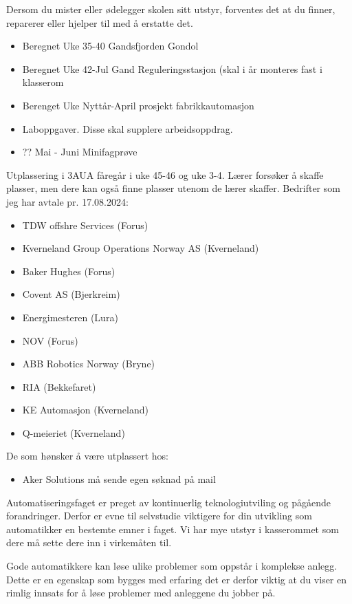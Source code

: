 \noindent
{} Dersom du mister eller ødelegger skolen sitt utstyr, forventes det at du finner, reparerer eller hjelper til med å erstatte det. 
\vskip 10pt
\vfil
\noindent
{} 
\begin{itemize}
	\item Beregnet Uke 35-40 Gandsfjorden Gondol
	\item Beregnet Uke 42-Jul Gand Reguleringsstasjon (skal i år monteres fast i klasserom
	\item Berenget Uke Nyttår-April prosjekt fabrikkautomasjon
	\item Laboppgaver. Disse skal supplere arbeidsoppdrag. 
	\item ?? Mai - Juni Minifagprøve
\end{itemize}
\vskip 10pt
\vfil
\noindent
{} Utplassering i 3AUA fåregår i uke 45-46 og uke 3-4. Lærer forsøker å skaffe plasser, men dere kan også finne plasser utenom de lærer skaffer. 
\vskip 1cm
Bedrifter som jeg har avtale pr. 17.08.2024:
\begin{itemize}
	\item TDW offshre Services (Forus)
	\item Kverneland Group Operations Norway AS (Kverneland)
	\item Baker Hughes (Forus)
	\item Covent AS (Bjerkreim)
	\item Energimesteren (Lura)
	\item NOV (Forus)
	\item ABB Robotics Norway (Bryne)
	\item RIA (Bekkefaret)
	\item KE Automasjon (Kverneland)
	\item Q-meieriet (Kverneland)
\end{itemize}
De som hønsker å være utplassert hos:
\begin {itemize}
	\item Aker Solutions må sende egen søknad på mail
\end {itemize}
\vskip 10pt
\vfil


\noindent
{} Automatiseringsfaget er preget av kontinuerlig teknologiutviling og pågående forandringer. Derfor er evne til selvstudie viktigere for din utvikling som automatikker en bestemte emner i faget. Vi har mye utstyr i kasserommet som dere må sette dere inn i virkemåten til. 

\vskip 10pt
\noindent
{} Gode automatikkere kan løse ulike problemer som oppstår i komplekse anlegg. Dette er en egenskap som bygges med erfaring det er derfor viktig at du viser en rimlig innsats for å løse problemer med anleggene du jobber på.
\vskip 10pt
\eject

